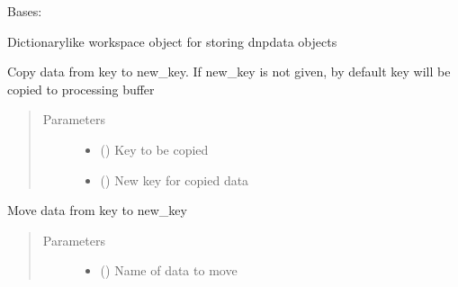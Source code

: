 \documentclass[letterpaper,10pt,english]{sphinxmanual}
\begin{document}
\begin{fulllineitems}
\label{\detokenize{dnpData:dnpLab.dnpdata_collection}}
Bases: 

Dictionary\sphinxhyphen{}like workspace object for storing dnpdata objects

\begin{fulllineitems}
\label{\detokenize{dnpData:dnpLab.dnpdata_collection.copy}}
Copy data from key to new\_key. If new\_key is not given, by default key will be copied to processing buffer
\begin{quote}\begin{description}
\item[{Parameters}] \leavevmode\begin{itemize}
\item {} 
 () \sphinxhyphen{}\sphinxhyphen{} Key to be copied

\item {} 
 (\sphinxstyleliteralemphasis{\sphinxupquote{, }}) \sphinxhyphen{}\sphinxhyphen{} New key for copied data

\end{itemize}

\end{description}\end{quote}

\end{fulllineitems}


\begin{fulllineitems}
\label{\detokenize{dnpData:dnpLab.dnpdata_collection.move}}
Move data from key to new\_key
\begin{quote}\begin{description}
\item[{Parameters}] \leavevmode\begin{itemize}
\item {} 
 () \sphinxhyphen{}\sphinxhyphen{} Name of data to move


\end{itemize}
\end{description}
\end{quote}
\end{fulllineitems}
\end{fulllineitems}
\end{document}
